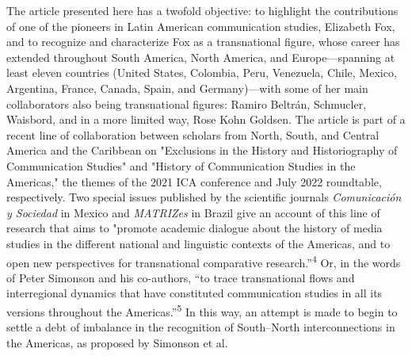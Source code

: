 \documentclass{tufte-handout}
\begin{document}
The article presented here has a twofold objective: to highlight the
contributions of one of the pioneers in Latin American communication
studies, Elizabeth Fox, and to recognize and characterize Fox as a
transnational figure, whose career has extended throughout South
America, North America, and Europe---spanning at least eleven countries
(United States, Colombia, Peru, Venezuela, Chile, Mexico, Argentina,
France, Canada, Spain, and Germany)---with some of her main
collaborators also being transnational figures: Ramiro Beltrán,
Schmucler, Waisbord, and in a more limited way, Rose Kohn Goldsen. The
article is part of a recent line of collaboration between scholars from
North, South, and Central America and the Caribbean on "Exclusions in
the History and Historiography of Communication Studies" and "History of
Communication Studies in the Americas," the themes of the 2021 ICA
conference and July 2022 roundtable, respectively. Two special issues
published by the scientific journals \emph{Comunicación y Sociedad} in
Mexico and \emph{MATRIZes} in Brazil give an account of this line of
research that aims to "promote academic dialogue about the history of
media studies in the different national and linguistic contexts of the
Americas, and to open new perspectives for transnational comparative
research.''\textsuperscript{4} Or, in the words of Peter Simonson and his co-authors,
``to trace transnational flows and interregional dynamics that have
constituted communication studies in all its versions throughout the
Americas.''\textsuperscript{5} In this
way, an attempt is made to begin to settle a debt of imbalance in the
recognition of South--North interconnections in the Americas, as
proposed by Simonson et al.
\end{document}
